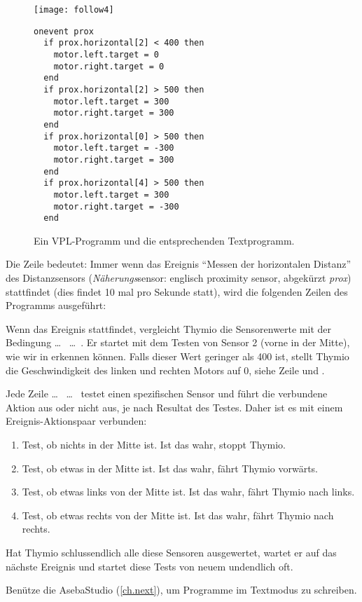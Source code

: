 \begin{figure}
\texttt{[image: follow4]}
\hfill
\begin{minipage}[b]{0.6\textwidth}
\footnotesize
\begin{lstlisting}
onevent prox
  if prox.horizontal[2] < 400 then
    motor.left.target = 0
    motor.right.target = 0
  end
  if prox.horizontal[2] > 500 then
    motor.left.target = 300
    motor.right.target = 300
  end
  if prox.horizontal[0] > 500 then
    motor.left.target = -300
    motor.right.target = 300
  end
  if prox.horizontal[4] > 500 then
    motor.left.target = 300
    motor.right.target = -300
  end
\end{lstlisting}
\end{minipage}
\caption{Ein VPL-Programm und die entsprechenden Textprogramm.}
\label{fig.textcode}
\end{figure}

Die Zeile  bedeutet:
Immer wenn das Ereignis ``Messen der horizontalen Distanz'' des Distanzsensors (\emph{Näherungs}sensor: englisch proximity sensor, abgekürzt \emph{prox}) 
stattfindet (dies findet 10 mal pro Sekunde statt), wird
die folgenden Zeilen des Programms ausgeführt:

Wenn das Ereignis stattfindet, vergleicht Thymio die Sensorenwerte mit der Bedingung
 \ldots \  \ldots \ .
Er startet mit dem Testen von Sensor 2 (vorne in der Mitte), wie wir in  erkennen können.
Falls dieser Wert geringer als 400 ist, stellt Thymio die Geschwindigkeit des linken und rechten Motors auf 0, siehe Zeile  und .

Jede Zeile
 \ldots \  \ldots \  
testet einen spezifischen Sensor und führt die verbundene Aktion aus oder nicht aus, je nach Resultat des Testes.
Daher ist es mit einem Ereignis-Aktionspaar verbunden:

\begin{enumerate}[start=0,noitemsep,nosep]
	\item Test, ob nichts in der Mitte ist. Ist das wahr, stoppt Thymio.
	\item Test, ob etwas in der Mitte ist. Ist das wahr, fährt Thymio vorwärts.
	\item Test, ob etwas links von der Mitte ist. Ist das wahr, fährt Thymio nach links.
	\item Test, ob etwas rechts von der Mitte ist. Ist das wahr, fährt Thymio nach rechts. 
\end{enumerate}

Hat Thymio schlussendlich alle diese Sensoren ausgewertet, wartet er auf das nächste Ereignis  und startet diese Tests von neuem undendlich oft.

Benütze die AsebaStudio (\cref{ch.next}), um Programme im Textmodus zu schreiben.


